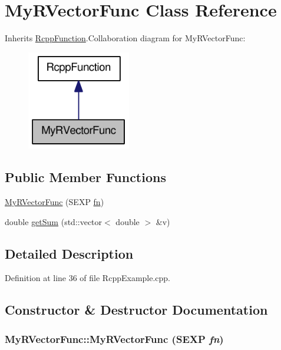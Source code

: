 \hypertarget{classMyRVectorFunc}{
\section{MyRVectorFunc Class Reference}
\label{classMyRVectorFunc}
}


Inherits \hyperlink{classRcppFunction}{RcppFunction}.Collaboration diagram for MyRVectorFunc:\nopagebreak
\begin{figure}[H]
\begin{center}
\leavevmode
\includegraphics[width=128pt]{classMyRVectorFunc__coll__graph}
\end{center}
\end{figure}
\subsection*{Public Member Functions}
\begin{DoxyCompactItemize}
\item 
\hyperlink{classMyRVectorFunc_adc09bab76bddb0c246ed98c942fd4cd8}{MyRVectorFunc} (SEXP \hyperlink{classRcppFunction_aa6b5966224b8b7d158be6cdfc3612063}{fn})
\item 
double \hyperlink{classMyRVectorFunc_a2eba5a390ca620a687e77208bfbb6df4}{getSum} (std::vector$<$ double $>$ \&v)
\end{DoxyCompactItemize}


\subsection{Detailed Description}


Definition at line 36 of file RcppExample.cpp.

\subsection{Constructor \& Destructor Documentation}
\hypertarget{classMyRVectorFunc_adc09bab76bddb0c246ed98c942fd4cd8}{
\subsubsection[{MyRVectorFunc}]{\setlength{\rightskip}{0pt plus 5cm}MyRVectorFunc::MyRVectorFunc (SEXP {\em fn})}}
\label{classMyRVectorFunc_adc09bab76bddb0c246ed98c942fd4cd8}



